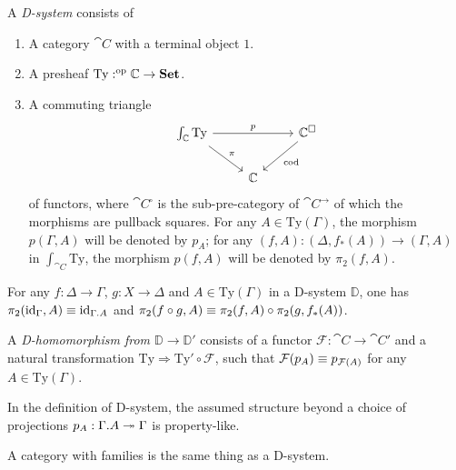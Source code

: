 \begin{defn}
A \emph{D-system} consists of
\begin{enumerate}
\item A category $\cat{C}$ with a terminal object $1$.
\item A presheaf $\mathrm{Ty}:^{\mathrm{op}}{\mathbb{C}}\to\mathbf{Set}$. 
\item A commuting triangle
\begin{equation*}
\begin{tikzcd}
\int_{\cat{C}}\mathrm{Ty} \arrow[rr,"p"] \arrow[dr,"\pi"] & & \cat{C}^\square \arrow[dl,"\mathrm{cod}"] \\
& \cat{C}
\end{tikzcd}
\end{equation*}
of functors, where $\cat{C}^\square$ is the sub-pre-category of $\cat{C}^{\to}$ of
which the morphisms are pullback squares. For any $A\in\mathrm{Ty}(\Gamma)$,
the morphism $p(\Gamma,A)$ will be denoted by $p_A$; for any
$(f,A):(\Delta,f_\ast(A))\to(\Gamma,A)$ in $\int_{\cat{C}}\mathrm{Ty}$, the morphism
$p(f,A)$ will be denoted by $\pi_2(f,A)$.
\end{enumerate}
\end{defn}

\begin{rmk}
For any $f:\Delta\to\Gamma$, $g:X\to\Delta$ and $A\in\mathrm{Ty}(\Gamma)$ in a
D-system $\mathbb{D}$, one has 
$\pi_2(\catid{\Gamma},A)\jdeq\catid{\ctxext{\Gamma}{A}}$ and
$\pi_2(f\circ g,A)\equiv \pi_2(f,A)\circ\pi_2(g,f_\ast(A))$.
\end{rmk}

\begin{defn}
A \emph{D-homomorphism from $\mathbb{D}\to\mathbb{D}'$} consists of a functor 
$\mathcal{F}:\cat{C}\to\cat{C}'$ and a natural transformation
$\mathrm{Ty}\Rightarrow\mathrm{Ty}'\circ\mathcal{F}$, such that 
$\mathcal{F}(p_A)\equiv p_{\mathcal{F}(A)}$ for any
$A\in\mathrm{Ty}(\Gamma)$.
\end{defn}

\begin{lem}
In the definition of D-system, the assumed structure beyond a choice of
projections $p_A:\ctxext{\Gamma}{A}\twoheadrightarrow\Gamma$ is property-like.
\end{lem}

\begin{thm}\label{thm:DD}
A category with families is the same thing as a D-system.
\end{thm}

